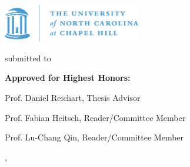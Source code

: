 
\begin{titlepage}

{\sffamily

\begin{center}

\includegraphics[width=60mm]{figures/institution.png}

\vfill\vfill\vfill
\vfill\vfill\vfill


\vfill\vfill\vfill

{\LARGE\bfseries\mytitle}


\vfill\vfill\vfill

{\LARGE\myauthor}

\vfill\vfill\vfill


{\bfseries\large\myworktitle}







submitted to

{\bfseries\large\myinstitute}
\vfill
{\bfseries\large\myuniversity}


\vfill\vfill

{\bfseries Approved for Highest Honors:}

Prof. Daniel Reichart, Thesis Advisor

Prof. Fabian Heitsch, Reader/Committee Member

Prof. Lu-Chang Qin, Reader/Committee Member
\vfill

\vfill



\vfill\vfill\vfill


\mysubmissiontown, \mysubmissionmonth~\mysubmissionyear

\end{center}
}%
\end{titlepage}

\newpage

